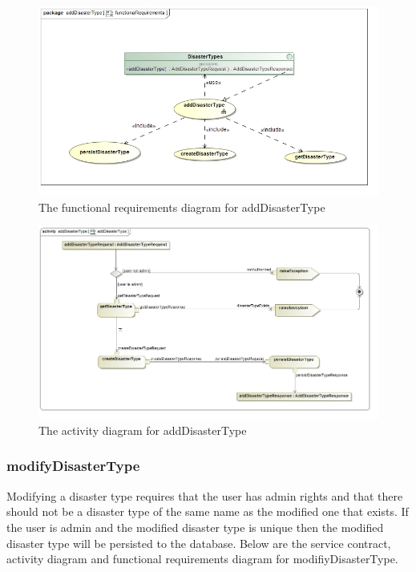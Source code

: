 \begin{figure}[H]
	\centering
	\includegraphics[width=1.0\textwidth]{../images/funcReq/AddDisasterTypeFunctionalRequirements.jpg}
	\caption{The functional requirements diagram for addDisasterType \label{overflow}}
\end{figure}

\begin{figure}[H]
	\centering
	\includegraphics[width=1.0\textwidth]{../images/funcReq/addDisasterTypeActivityDiagram.jpg}
	\caption{The activity diagram for addDisasterType \label{overflow}}
\end{figure}

\subsubsection{modifyDisasterType}

Modifying a disaster type requires that the user has admin rights and that there should not be a disaster type of the same name as the modified one that exists. If the user is admin and the modified disaster type is unique then the modified disaster type will be persisted to the database. Below are the service contract, activity diagram and functional requirements diagram for modifiyDisasterType.

